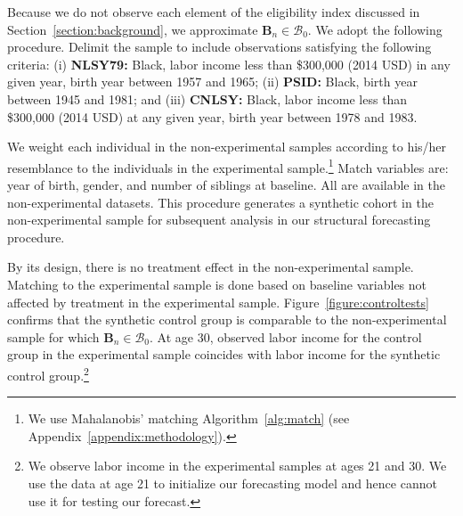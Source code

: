 Because we do not observe each element of the eligibility index discussed in Section~\ref{section:background}, we approximate $\bm{B}_{n} \in \mathcal{B}_0$. We adopt the following procedure. Delimit the sample to include observations satisfying the following criteria: (i) \textbf{NLSY79:} Black, labor income less than \$300,000 (2014 USD) in any given year, birth year between 1957 and 1965; (ii) \textbf{PSID:} Black, birth year between 1945 and 1981; and (iii) \textbf{CNLSY:} Black, labor income less than \$300,000 (2014 USD) at any given year, birth year between 1978 and 1983.

We weight each individual in the non-experimental samples according to his/her resemblance to the individuals in the experimental sample.\footnote{We use Mahalanobis' matching Algorithm~\ref{alg:match} (see Appendix~\ref{appendix:methodology}).} Match variables are: year of birth, gender, and number of siblings at baseline. All are available in the non-experimental datasets. This procedure generates a synthetic cohort in the non-experimental sample for subsequent analysis in our structural forecasting procedure.

By its design, there is no treatment effect in the non-experimental sample. Matching to the experimental sample is done based on baseline variables not affected by treatment in the experimental sample. Figure~\ref{figure:controltests} confirms that the synthetic control group is comparable to the non-experimental sample for which $\bm{B}_{n} \in \mathcal{B}_0$. At age 30, observed labor income for the control group in the experimental sample coincides with labor income for the synthetic control group.\footnote{We observe labor income in the experimental samples at ages 21 and 30. We use the data at age 21 to initialize our forecasting model and hence cannot use it for testing our forecast.}

